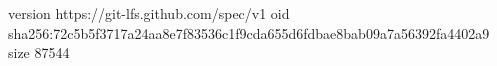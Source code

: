 version https://git-lfs.github.com/spec/v1
oid sha256:72c5b5f3717a24aa8e7f83536c1f9cda655d6fdbae8bab09a7a56392fa4402a9
size 87544
